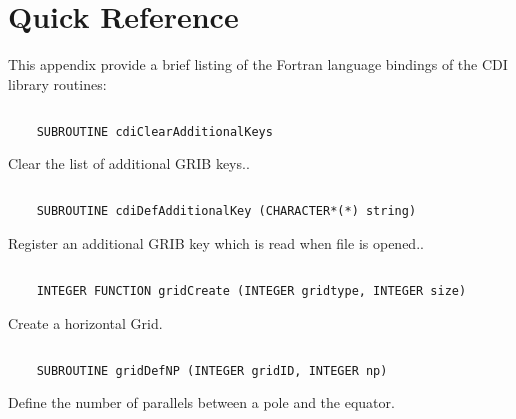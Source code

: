 \chapter*{Quick Reference}

This appendix provide a brief listing of the Fortran language bindings of the
CDI library routines:

\section*{\tt {}}

\begin{verbatim}
    SUBROUTINE cdiClearAdditionalKeys
\end{verbatim}

Clear the list of additional GRIB keys..


\section*{\tt {}}

\begin{verbatim}
    SUBROUTINE cdiDefAdditionalKey (CHARACTER*(*) string)
\end{verbatim}

Register an additional GRIB key which is read when file is opened..


\section*{\tt {}}

\begin{verbatim}
    INTEGER FUNCTION gridCreate (INTEGER gridtype, INTEGER size)
\end{verbatim}

Create a horizontal Grid.


\section*{\tt {}}

\begin{verbatim}
    SUBROUTINE gridDefNP (INTEGER gridID, INTEGER np)
\end{verbatim}

Define the number of parallels between a pole and the equator.


